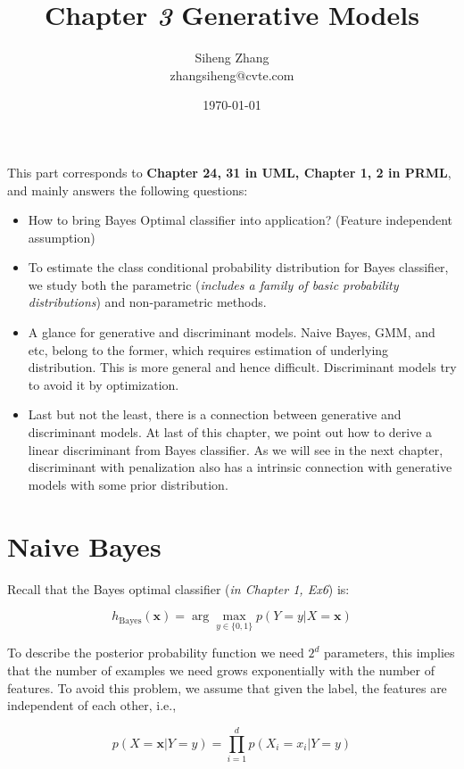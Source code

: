 \documentclass{article}
\author{Siheng Zhang\\zhangsiheng@cvte.com}
\title{Chapter \textbf{\textit{3}} Generative Models}
\date{\today}
\begin{document}
\maketitle  

This part corresponds to \textbf{Chapter 24, 31 in UML, Chapter 1, 2 in PRML}, and mainly answers the following questions:

\begin{itemize}
\item How to bring Bayes Optimal classifier into application? (Feature independent assumption)
\item To estimate the class conditional probability distribution for Bayes classifier, we study both the parametric (\textit{includes a family of basic probability distributions}) and non-parametric methods.
\item A glance for generative and discriminant models. Naive Bayes, GMM, and etc, belong to the former, which requires estimation of underlying distribution. This is more general and hence difficult. Discriminant models try to avoid it by optimization.
\item Last but not the least, there is a connection between generative and discriminant models. At last of this chapter, we point out how to derive a linear discriminant from Bayes classifier. As we will see in the next chapter, discriminant with penalization also has a intrinsic connection with generative models with some prior distribution.
\end{itemize}

\tableofcontents
\newpage

\section{Naive Bayes}

	Recall that the Bayes optimal classifier (\textit{in Chapter 1, Ex6}) is:
	
	\begin{equation*}
	h_{\mathrm{Bayes}}(\bm{x}) = \arg\max\limits_{y\in\{0,1\}} p (Y=y|X=\bm{x})
	\end{equation*}
	
	To describe the posterior probability function we need $2^d$ parameters, this implies that the number of examples we need grows exponentially with the number of features. To avoid this problem, we assume that given the label, the features are independent of each other, i.e., 
	
	\begin{equation*}
	p (X=\bm{x}|Y=y) = \prod_{i=1}^d p (X_i=x_i|Y=y)
	\end{equation*}
	
\end{document}
